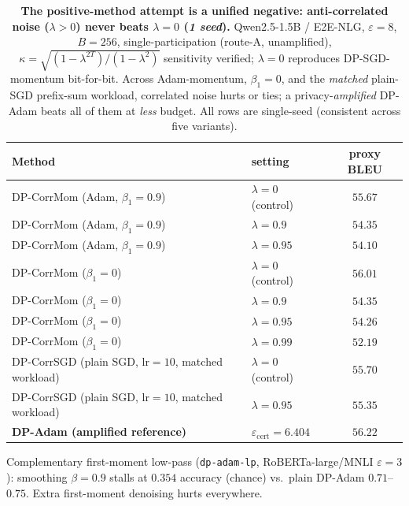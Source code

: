 \documentclass[11pt]{article}
\theoremstyle{plain}
\theoremstyle{definition}
\theoremstyle{remark}
\begin{document}
\begin{table}[t]
\centering
\caption{\textbf{The positive-method attempt is a unified negative: anti-correlated noise
($\lambda{>}0$) never beats $\lambda{=}0$ (\emph{1 seed}).} Qwen2.5-1.5B / E2E-NLG,
$\varepsilon{=}8$, $B{=}256$, single-participation (route-A, unamplified), $\kappa{=}\sqrt{(1-\lambda^{2T})/(1-\lambda^2)}$
sensitivity verified; $\lambda{=}0$ reproduces DP-SGD-momentum bit-for-bit. Across Adam-momentum,
$\beta_1{=}0$, and the \emph{matched} plain-SGD prefix-sum workload, correlated noise hurts or
ties; a privacy-\emph{amplified} DP-Adam beats all of them at \emph{less} budget. All rows are
single-seed (consistent across five variants).}
\label{tab:corrmom}
\begin{tabular}{llc}
\toprule
Method & setting & proxy BLEU \\
\midrule
DP-CorrMom (Adam, $\beta_1{=}0.9$) & $\lambda{=}0$ (control)        & $55.67$ \\
DP-CorrMom (Adam, $\beta_1{=}0.9$) & $\lambda{=}0.9$               & $54.35$ \\
DP-CorrMom (Adam, $\beta_1{=}0.9$) & $\lambda{=}0.95$              & $54.10$ \\
\midrule
DP-CorrMom ($\beta_1{=}0$)         & $\lambda{=}0$ (control)        & $56.01$ \\
DP-CorrMom ($\beta_1{=}0$)         & $\lambda{=}0.9$               & $54.35$ \\
DP-CorrMom ($\beta_1{=}0$)         & $\lambda{=}0.95$              & $54.26$ \\
DP-CorrMom ($\beta_1{=}0$)         & $\lambda{=}0.99$             & $52.19$ \\
\midrule
DP-CorrSGD (plain SGD, lr$=10$, matched workload) & $\lambda{=}0$ (control) & $55.70$ \\
DP-CorrSGD (plain SGD, lr$=10$, matched workload) & $\lambda{=}0.95$        & $55.35$ \\
\midrule
\textbf{DP-Adam (amplified reference)} & $\varepsilon_{\mathrm{cert}}{=}6.404$ & $\mathbf{56.22}$ \\
\bottomrule
\end{tabular}
\par\smallskip
{\footnotesize Complementary first-moment low-pass (\texttt{dp-adam-lp}, RoBERTa-large/MNLI
$\varepsilon{=}3$): smoothing $\beta{=}0.9$ stalls at $0.354$ accuracy (chance) vs.\ plain
DP-Adam $0.71$--$0.75$. Extra first-moment denoising hurts everywhere.}
\end{table}
\end{document}
